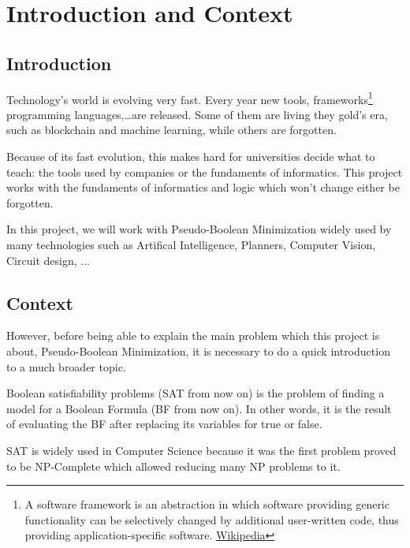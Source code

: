 \chapter{Introduction and Context}
\label{Chapter1}

\section{Introduction}
Technology's world is evolving very fast. Every year new tools, frameworks\footnote{A software framework is an abstraction in which software providing generic functionality can be selectively changed by additional user-written code, thus providing application-specific software. \href{https://en.wikipedia.org/wiki/Software_framework}{Wikipedia}} programming languages,\ldots are released. Some of them are living they gold's era, such as blockchain and machine learning,  while others are forgotten.  

Because of its fast evolution, this makes hard for universities decide what to teach: the tools used by companies or the fundaments of informatics. 
This project works with the fundaments of informatics and logic which won't change either be forgotten.

In this project, we will work with Pseudo-Boolean Minimization widely used by many technologies such as Artifical Intelligence, Planners, Computer Vision,  Circuit design, ... 


\section{Context} 

However, before being able to explain the main problem which this project is about, Pseudo-Boolean Minimization, it is necessary to do a quick introduction to a much broader topic. 



Boolean satisfiability problems (SAT from now on) is the problem of finding a model for a Boolean Formula (BF from now on). In other words, it is the result of evaluating the BF after replacing its variables for true or false. 

SAT is widely used in Computer Science because it was the first problem proved to be NP-Complete which allowed reducing many NP problems to it\cite{Cook1971}.

